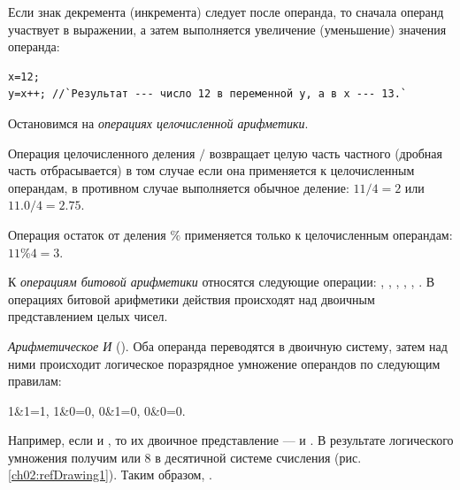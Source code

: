 Если знак декремента (инкремента) следует после операнда, то сначала операнд участвует в выражении, а затем выполняется
увеличение (уменьшение) значения операнда:
\begin{lstlisting}
x=12;
y=x++; //`Результат --- число 12 в переменной y, а в x --- 13.`
\end{lstlisting}

Остановимся на \emph{операциях целочисленной
арифметики}. 

Операция целочисленного деления $/$ возвращает целую часть частного (дробная часть отбрасывается) в том
случае если она применяется к целочисленным операндам, в противном случае выполняется обычное деление: $11/4=2$ или
$11.0/4=2.75$.

Операция остаток от деления $\%$ применяется только к целочисленным операндам: $11\%4 = 3$.

К \emph{операциям битовой арифметики} относятся
следующие операции: \Sys{\&}, \Sys{{\textbar}}, \Sys{\^{}},
\Sys{\~{}}, \Sys{{<}{<}}, \Sys{{>}{>}}. В
операциях битовой арифметики действия происходят над двоичным представлением целых чисел. 

\emph{Арифметическое И} (\Sys{\&}). Оба операнда переводятся в двоичную систему, затем над
ними происходит логическое поразрядное умножение операндов по следующим правилам: 

1\&1=1, 1\&0=0, 0\&1=0, 0\&0=0. 

Например, если  и , то их двоичное представление ---
 и . В результате логического умножения
 получим  или 8 в десятичной системе
счисления (рис. \ref{ch02:refDrawing1}). Таким образом, .


